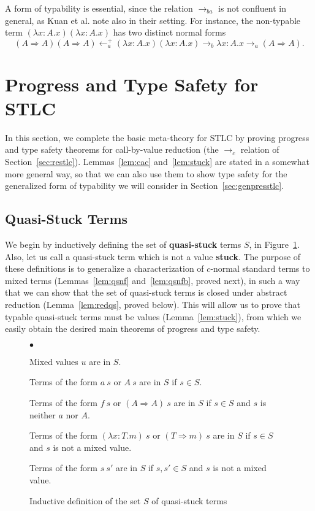\documentclass{LMCS}
\newcommand{\To}[0]{\Rightarrow}
\begin{document}
A form of typability is essential, since the relation $\to_{ba}$ is not
confluent in general, as Kuan et al. note also in their setting.  For
instance, the non-typable term $(\lambda x:A.x)(\lambda x:A.x)$ has
two distinct normal forms
\[ (A \To A)(A \To A) \leftarrow_a^+ (\lambda x:A.x)(\lambda x:A.x)
\to_b \lambda x:A.x \to_a (A \To A).\]

\section{Progress and Type Safety for STLC}
\label{sec:progtpsafe}

In this section, we complete the basic meta-theory for STLC by proving
progress and type safety theorems for call-by-value reduction (the
$\to_c$ relation of Section~\ref{sec:restlc}).  Lemmas~\ref{lem:cac}
and~\ref{lem:stuck} are stated in a somewhat more general way, so that
we can also use them to show type safety for the generalized form of
typability we will consider in Section~\ref{sec:genpresstlc}.

\subsection{Quasi-Stuck Terms}

We begin by inductively defining the set of \textbf{quasi-stuck} terms
$S$, in Figure~\ref{fig:qs}.  Also, let us call a quasi-stuck term
which is not a value \textbf{stuck}.  The purpose of these definitions
is to generalize a characterization of $c$-normal standard terms to
mixed terms (Lemmas~\ref{lem:qsnf} and~\ref{lem:qsnfb}, proved next),
in such a way that we can show that the set of quasi-stuck terms is
closed under abstract reduction (Lemma~\ref{lem:redqs}, proved below).
This will allow us to prove that typable quasi-stuck terms must be
values (Lemma~\ref{lem:stuck}), from which we easily obtain the
desired main theorems of progress and type safety.

\begin{figure}[b]
\begin{iteMize}{$\bullet$}
\item Mixed values $u$ are in $S$.
\item Terms of the form $a\ s$ or $A\ s$ are in $S$ if $s\in S$.
\item Terms of the form $f\ s$ or $(A\To A)\ s$ are in $S$ if $s\in S$ and $s$ is neither $a$ nor $A$.
\item Terms of the form $(\lambda x:T.m)\ s$ or $(T\To m)\ s$ are in $S$ if $s\in S$ and $s$ is not a mixed value.
\item Terms of the form $s\ s'$ are in $S$ if $s,s'\in S$ and $s$ is not a mixed value.
\end{iteMize}
\caption{Inductive definition of the set $S$ of quasi-stuck terms}
\label{fig:qs}
\end{figure}
\end{document}
